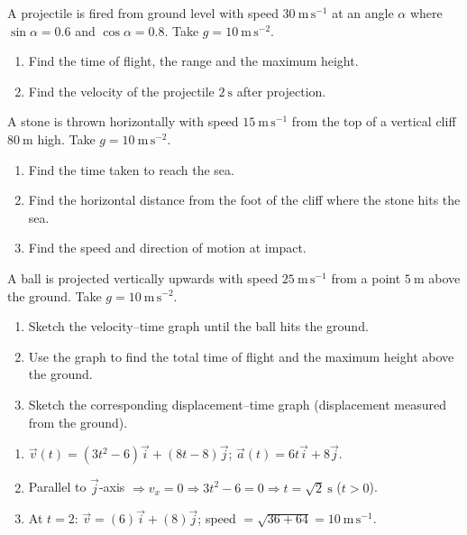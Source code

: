 \documentclass[11pt]{article}
\begin{document}
\begin{exercice}
A projectile is fired from ground level with speed $30\ \mathrm{m\,s^{-1}}$ at an angle $\alpha$ where $\sin\alpha=0.6$ and $\cos\alpha=0.8$. Take $g=10\ \mathrm{m\,s^{-2}}$.
\begin{enumerate}
\item Find the time of flight, the range and the maximum height.
\item Find the velocity of the projectile $2\ \mathrm{s}$ after projection.
\end{enumerate}
\end{exercice}

\begin{exercice}
A stone is thrown horizontally with speed $15\ \mathrm{m\,s^{-1}}$ from the top of a vertical cliff $80\ \mathrm{m}$ high. Take $g=10\ \mathrm{m\,s^{-2}}$.
\begin{enumerate}
\item Find the time taken to reach the sea.
\item Find the horizontal distance from the foot of the cliff where the stone hits the sea.
\item Find the speed and direction of motion at impact.
\end{enumerate}
\end{exercice}

\begin{exercice}
A ball is projected vertically upwards with speed $25\ \mathrm{m\,s^{-1}}$ from a point $5\ \mathrm{m}$ above the ground. Take $g=10\ \mathrm{m\,s^{-2}}$.
\begin{enumerate}
\item Sketch the velocity--time graph until the ball hits the ground.
\item Use the graph to find the total time of flight and the maximum height above the ground.
\item Sketch the corresponding displacement--time graph (displacement measured from the ground).
\end{enumerate}
\end{exercice}

\begin{corrige}[Exercise 1]
\begin{enumerate}
\item $\vec{v}(t)=(3t^2-6)\vec{i}+(8t-8)\vec{j}$; $\vec{a}(t)=6t\vec{i}+8\vec{j}$.
\item Parallel to $\vec{j}$-axis $\Rightarrow v_x=0 \Rightarrow 3t^2-6=0 \Rightarrow t=\sqrt{2}\ \mathrm{s}$ ($t>0$).
\item At $t=2$: $\vec{v}=(6)\vec{i}+(8)\vec{j}$; speed $=\sqrt{36+64}=10\ \mathrm{m\,s^{-1}}$.
\end{enumerate}
\end{corrige}
\end{document}

